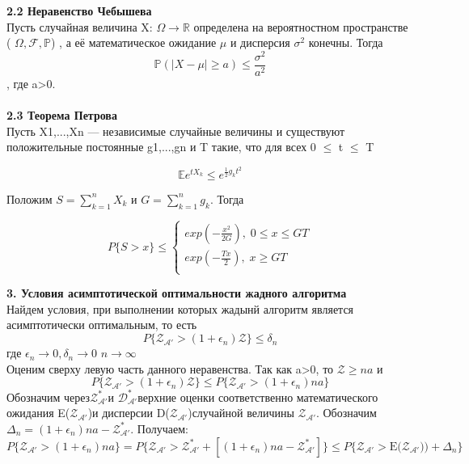 \documentclass[a4paper, 14pt]{extarticle}
\begin{document}
\textbf{2.2 Неравенство Чебышева} \\

Пусть случайная величина X: $\Omega\rightarrow\mathbb {R}$ определена на вероятностном пространстве ( $\Omega,{\mathcal {F}},\mathbb {P} $)
, а её математическое ожидание $\mu$ и дисперсия  $\sigma ^{2}$ конечны. Тогда 
\begin{equation}
{\mathbb {P}}\left(|X-\mu |\geqslant a\right)\leqslant {\frac {\sigma ^{2}}{a^{2}}}
\end{equation},
где  a>0. \\ \\
\textbf{2.3 Теорема Петрова} \\

Пусть X1,...,Xn — независимые случайные величины и
существуют положительные постоянные g1,...,gn и T такие, что для всех 0 $\leq$ t $\leq$ T

\begin{equation}
\mathbb {E}e^{tX_k} \leq e^{\frac{1}{2} g_k t^{2}}
\end{equation}

Положим $S=\sum_{k=1}^{n} X_k $ и $G=\sum_{k=1}^{n} g_k $. Тогда

\begin{equation}
P\{S > x\} \leq 
\begin{cases}
   exp (-\frac{x^{2}}{2G}), \; 0 \leq x \leq GT\\
   exp (-\frac{Tx}{2}), \; x\geq GT \\
 \end{cases}
\end{equation}

\textbf{3. Условия асимптотической оптимальности жадного алгоритма}\\

Найдем условия, при выполнении которых жадынй алгоритм является асимптотически оптимальным, то есть
\begin{equation}
P\{\mathcal{Z_{A'}} > (1+\epsilon_n)\mathcal{Z}\}\leq \delta_n
\end{equation}
где $\epsilon_n \rightarrow 0, \delta_n \rightarrow 0$ $n \rightarrow \infty$\\
Оценим сверху левую часть данного неравенства. Так как a>0, то $\mathcal{Z} \geq na$ и 
\begin{equation}\label{4}
P\{\mathcal{Z_{A'}} > (1+\epsilon_n)\mathcal{Z}\}\leq P\{\mathcal{Z_{A'}} > (1+\epsilon_n)na\}
\end{equation}
\newcommand{\algorithm}{$\mathcal{A'}$}
\newcommand{\topboundE}{$\mathcal{Z^*_{A'}}$}
\newcommand{\topboundD}{$\mathcal{D^*_{A'}}$}
\newcommand{\randomvalue}{$\mathcal{Z_{A'}}$}
\newcommand{\randomvalueE}{E(\randomvalue)}
\newcommand{\randomvalueD}{D(\randomvalue)}
Обозначим через\topboundE и \topboundD верхние оценки соответственно математического ожидания \randomvalueE и дисперсии \randomvalueD случайной величины \randomvalue . Обозначим $\Delta_n=(1+\epsilon_n)na-\text{\topboundE}$. Получаем:
\begin{equation}\label{5}
P\{\text{\randomvalue} > (1+\epsilon_n)na\} = 
P\{\text{\randomvalue} > \text{\topboundE}+[(1+\epsilon_n)na-\text{\topboundE}]\} \leq
P\{\text{\randomvalue} > \text{\randomvalueE})+ \Delta_n\}
\end{equation}
\end{document}
